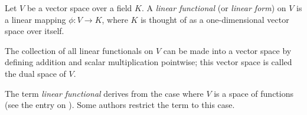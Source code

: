 \documentclass[12pt]{article}
\begin{document}

Let $V$ be a vector space over a field $K$.
A \emph{linear functional} (or \emph{linear form}) on $V$
is a linear mapping $\phi\colon V\to K$,
where $K$ is thought of as a one-dimensional vector space over itself.

The collection of all linear functionals on $V$
can be made into a vector space
by defining addition and scalar multiplication pointwise;
this vector space is called the dual space of $V$.

The term {\it linear functional} derives from
the case where $V$ is a space of functions
(see the entry on ).
Some authors restrict the term to this case.
\end{document}
